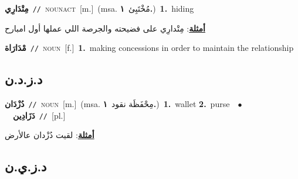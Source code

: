 \documentclass[10pt,a4paper,twoside]{article} %
\begin{document}
\begin{multicols}{2}
{\setlength\topsep{0pt}\textbf{\foreignlanguage{arabic}{مِتْدَارِي}}\ {\color{gray}\texttt{//}\color{black}}\ \textsc{noun\textunderscore act}\ [m.]\ \color{gray}(msa. \foreignlanguage{arabic}{مُخْتَبِئ}~\foreignlanguage{arabic}{\textbf{١.}})\color{black}\ \textbf{1.}~hiding\  \begin{flushright}\color{gray}\foreignlanguage{arabic}{\textbf{\underline{\foreignlanguage{arabic}{أمثلة}}}: مِتْدارِي على فضيحته والجرصة اللي عملها أول امبارح}\end{flushright}\color{black}} \vspace{2mm}

{\setlength\topsep{0pt}\textbf{\foreignlanguage{arabic}{مْدَارَاة}}\ {\color{gray}\texttt{//}\color{black}}\ \textsc{noun}\ [f.]\ \textbf{1.}~making concessions in order to maintain the relationship\ } \vspace{2mm}

\vspace{-3mm}
\subsection*{\color{blue}\foreignlanguage{arabic}{د.ز.د.ن}\color{blue}{ (ntws)}} 

{\setlength\topsep{0pt}\textbf{\foreignlanguage{arabic}{دُزْدَان}}\ {\color{gray}\texttt{//}\color{black}}\ \textsc{noun}\ [m.]\ \color{gray}(msa. \foreignlanguage{arabic}{مِحْفَظَة نقود}~\foreignlanguage{arabic}{\textbf{١.}})\color{black}\ \textbf{1.}~wallet  \textbf{2.}~purse\ \ $\bullet$\ \ \setlength\topsep{0pt}\textbf{\foreignlanguage{arabic}{دَزَادِين}}\ {\color{gray}\texttt{//}\color{black}}\ [pl.]\  \begin{flushright}\color{gray}\foreignlanguage{arabic}{\textbf{\underline{\foreignlanguage{arabic}{أمثلة}}}: لقيت دُزْدان عالأرض}\end{flushright}\color{black}} \vspace{2mm}

\vspace{-3mm}
\subsection*{\color{blue}\foreignlanguage{arabic}{د.ز.ي.ن}\color{blue}{ (ntws)}} 


\end{multicols}
\end{document}
